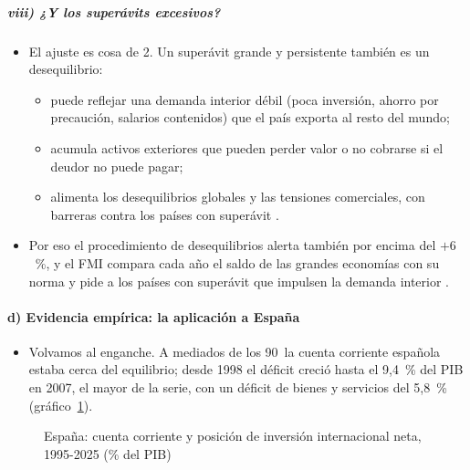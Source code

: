 \documentclass[11pt]{article}
\begin{document}
\subparagraph{viii) ¿Y los superávits excesivos?}

\begin{itemize}
\item El ajuste es cosa de 2. Un superávit grande y persistente también es un desequilibrio:
  \begin{itemize}
  \item puede reflejar una demanda interior débil (poca inversión, ahorro por precaución, salarios contenidos) que el país exporta al resto del mundo;
  \item acumula activos exteriores que pueden perder valor o no cobrarse si el deudor no puede pagar;
  \item alimenta los desequilibrios globales y las tensiones comerciales, con barreras contra los países con superávit\nocite{Bernanke2005Saving,BlanchardMilesiFerretti2012} .
  \end{itemize}
\item Por eso el procedimiento de desequilibrios alerta también por encima del $+6$~\%, y el FMI compara cada año el saldo de las grandes economías con su norma y pide a los países con superávit que impulsen la demanda interior\nocite{FMI2026ESR} .
\end{itemize}

\paragraph{d) Evidencia empírica: la aplicación a España}

\begin{itemize}
\item Volvamos al enganche. A mediados de los 90~la cuenta corriente española estaba cerca del equilibrio; desde 1998 el déficit creció hasta el 9,4~\% del PIB en 2007, el mayor de la serie, con un déficit de bienes y servicios del 5,8~\%\nocite{BdE2026BE17,Eurostat2026tipsbp11} (gráfico~\ref{fig:cc-piin-espana}).
\end{itemize}

\begin{figure}[H]
\centering
\caption{España: cuenta corriente y posición de inversión internacional neta, 1995-2025 (\% del PIB)}\label{fig:cc-piin-espana}
\end{figure}
\end{document}
